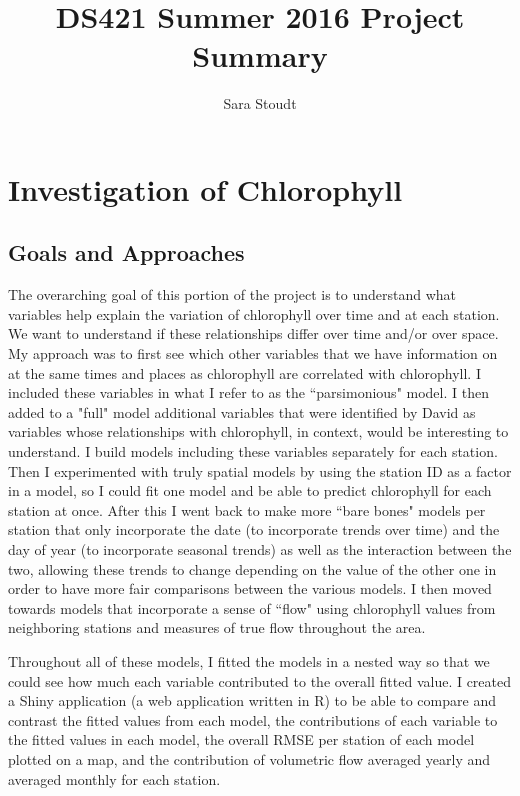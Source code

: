 \documentclass[12pt]{amsart}
\title{DS421 Summer 2016 Project Summary}
\author{Sara Stoudt}
\begin{document}
\maketitle

\section{Investigation of Chlorophyll}

\subsection{Goals and Approaches}
The overarching goal of this portion of the project is to understand what variables help explain the variation of chlorophyll over time and at each station. We want to understand if these relationships differ over time and/or over space. My approach was to first see which other variables that we have information on at the same times and places as chlorophyll are correlated with chlorophyll. I included these variables in what I refer to as the ``parsimonious" model. I then added to a "full" model additional variables that were identified by David as variables whose relationships with chlorophyll, in context, would be interesting to understand. I build models including these variables separately for each station. Then I experimented with truly spatial models by using the station ID as a factor in a model, so I could fit one model and be able to predict chlorophyll for each station at once. After this I went back to make more ``bare bones" models per station that only incorporate the date (to incorporate trends over time) and the day of year (to incorporate seasonal trends) as well as the interaction between the two, allowing these trends to change depending on the value of the other one in order to have more fair comparisons between the various models. I then moved towards models that incorporate a sense of ``flow" using chlorophyll values from neighboring stations and measures of true flow throughout the area. 

Throughout all of these models, I fitted the models in a nested way so that we could see how much each variable contributed to the overall fitted value. I created a Shiny application (a web application written in R) to be able to compare and contrast the fitted values from each model, the contributions of each variable to the fitted values in each model, the overall RMSE per station of each model plotted on a map, and the contribution of volumetric flow averaged yearly and averaged monthly for each station.
\end{document}
